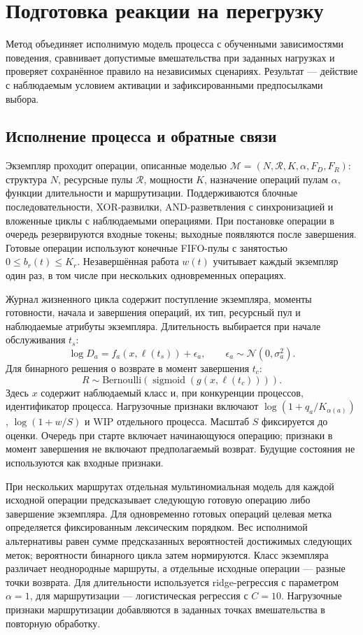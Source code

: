 \section{Подготовка реакции на перегрузку}
Метод объединяет исполнимую модель процесса с обученными зависимостями поведения, сравнивает допустимые вмешательства при заданных нагрузках и проверяет сохранённое правило на независимых сценариях. Результат — действие с наблюдаемым условием активации и зафиксированными предпосылками выбора.

\subsection{Исполнение процесса и обратные связи}
Экземпляр проходит операции, описанные моделью $\mathcal M=(N,\mathcal R,K,\alpha,F_D,F_R)$: структура $N$, ресурсные пулы $\mathcal R$, мощности $K$, назначение операций пулам $\alpha$, функции длительности и маршрутизации. Поддерживаются блочные последовательности, XOR-развилки, AND-разветвления с синхронизацией и вложенные циклы с наблюдаемыми операциями. При постановке операции в очередь резервируются входные токены; выходные появляются после завершения. Готовые операции используют конечные FIFO-пулы с занятостью $0\leq b_r(t)\leq K_r$. Незавершённая работа $w(t)$ учитывает каждый экземпляр один раз, в том числе при нескольких одновременных операциях.

Журнал жизненного цикла содержит поступление экземпляра, моменты готовности, начала и завершения операций, их тип, ресурсный пул и наблюдаемые атрибуты экземпляра. Длительность выбирается при начале обслуживания $t_s$:
\begin{equation}\label{eq:duration}
\log D_a=f_a(x,\ell(t_s))+\epsilon_a,\qquad \epsilon_a\sim\mathcal N(0,\sigma_a^2).
\end{equation}
Для бинарного решения о возврате в момент завершения $t_c$:
\begin{equation}\label{eq:return}
R\sim\mathrm{Bernoulli}\!\left(\operatorname{sigmoid}(g(x,\ell(t_c)))\right).
\end{equation}
Здесь $x$ содержит наблюдаемый класс и, при конкуренции процессов, идентификатор процесса. Нагрузочные признаки включают $\log(1+q_a/K_{\alpha(a)})$, $\log(1+w/S)$ и WIP отдельного процесса. Масштаб $S$ фиксируется до оценки. Очередь при старте включает начинающуюся операцию; признаки в момент завершения не включают предполагаемый возврат. Будущие состояния не используются как входные признаки.

При нескольких маршрутах отдельная мультиномиальная модель для каждой исходной операции предсказывает следующую готовую операцию либо завершение экземпляра. Для одновременно готовых операций целевая метка определяется фиксированным лексическим порядком. Вес исполнимой альтернативы равен сумме предсказанных вероятностей достижимых следующих меток; вероятности бинарного цикла затем нормируются. Класс экземпляра различает неоднородные маршруты, а отдельные исходные операции — разные точки возврата. Для длительности используется ridge-регрессия с параметром $\alpha=1$, для маршрутизации — логистическая регрессия с $C=10$. Нагрузочные признаки маршрутизации добавляются в заданных точках вмешательства в повторную обработку.

